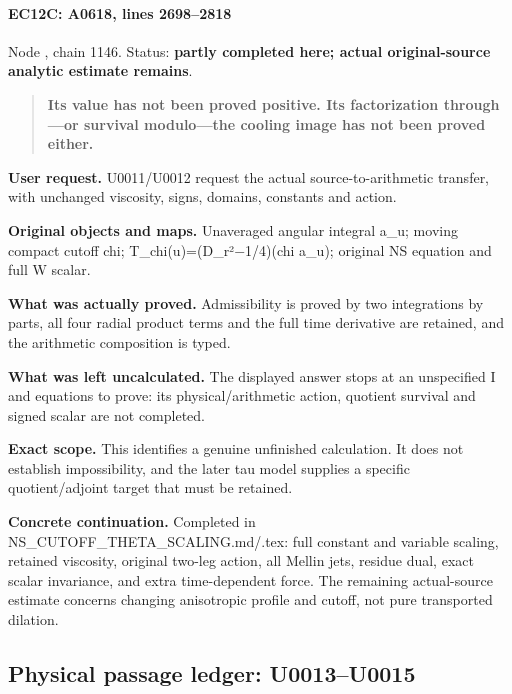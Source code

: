 \paragraph{EC12C: A0618, lines
2698--2818}\label{ec12c-a0618-lines-26982818}

Node \protect{}, chain 1146.
Status: \textbf{partly completed here; actual original-source analytic
estimate remains}.

\begin{quote}
\textbf{Its value has not been proved positive. Its factorization
through---or survival modulo---the cooling image has not been proved
either.}
\end{quote}

\textbf{User request.} U0011/U0012 request the actual
source-to-arithmetic transfer, with unchanged viscosity, signs, domains,
constants and action.

\textbf{Original objects and maps.} Unaveraged angular integral a\_u;
moving compact cutoff chi;
T\_chi(u)=(D\_r²\allowbreak{}\ensuremath{−}\allowbreak{}1/4)(chi a\_u);
original NS equation and full W scalar.

\textbf{What was actually proved.} Admissibility is proved by two
integrations by parts, all four radial product terms and the full time
derivative are retained, and the arithmetic composition is typed.

\textbf{What was left uncalculated.} The displayed answer stops at an
unspecified I and equations to prove: its physical/arithmetic action,
quotient survival and signed scalar are not completed.

\textbf{Exact scope.} This identifies a genuine unfinished calculation.
It does not establish impossibility, and the later tau model supplies a
specific quotient/adjoint target that must be retained.

\textbf{Concrete continuation.} Completed in
NS\_CUTOFF\_THETA\_SCALING.md/.tex: full constant and variable scaling,
retained viscosity, original two-leg action, all Mellin jets, residue
dual, exact scalar invariance, and extra time-dependent force. The
remaining actual-source estimate concerns changing anisotropic profile
and cutoff, not pure transported dilation.

\subsection{Physical passage ledger:
U0013--U0015}\label{physical-passage-ledger-u0013u0015}

